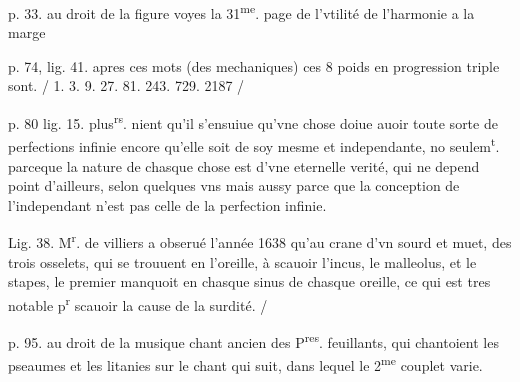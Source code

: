\documentclass[11pt,a4paper]{article}
\begin{document}
p. 33.  au droit de la figure
voyes la 31\textsuperscript{me}. page de l'vtilité de l'harmonie a la marge

p. 74, lig. 41. apres ces mots (des mechaniques)
ces 8 poids en progression triple sont. / 1. 3. 9. 27. 81. 243. 729. 2187 /

p. 80 lig. 15.
plus\textsuperscript{rs}. nient qu'il s'ensuiue qu'vne chose doiue auoir toute sorte de perfections infinie encore qu'elle soit de soy mesme et independante, no seulem\textsuperscript{t}. parceque la nature de chasque chose est d'vne eternelle verité, qui ne depend point d'ailleurs, selon quelques vns mais aussy parce que la conception de l'independant n'est pas celle de la perfection infinie.

Lig. 38.
M\textsuperscript{r}. de villiers a obserué l'année 1638 qu'au crane d'vn sourd et muet, des trois osselets, qui se trouuent en l'oreille, à scauoir l'incus, le malleolus, et le stapes, le premier manquoit en chasque sinus de chasque oreille, ce qui est tres notable p\textsuperscript{r} scauoir la cause de la surdité. /


p. 95. au droit de la musique
chant ancien des P\textsuperscript{res}. feuillants, qui chantoient les pseaumes et les litanies sur le chant qui suit, dans lequel le 2\textsuperscript{me} couplet varie.


\end{document}

